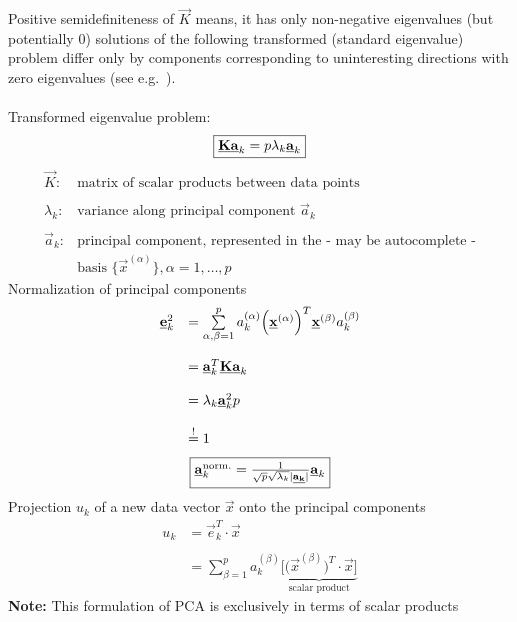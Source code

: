 Positive semidefiniteness of $\vec{K}$
means,
it has only non-negative eigenvalues (but potentially 0) 
\ra
solutions
of the following transformed (standard eigenvalue) problem differ only by components corresponding to
uninteresting directions with zero eigenvalues
(see e.g.\ \cite{Bishop2006}).
\\\\
Transformed eigenvalue problem:
\begin{equation}
	\fbox{$ \vec{K} \vec{a}_k = p \lambda_k \vec{a}_k $}
\end{equation}
\[ \begin{array}{ll}
	\vec{K}: & \text{matrix of scalar products between data points} \\\\
	\lambda_k: & \text{variance along principal component } \vec{a}_k \\\\
	\vec{a}_k: & \text{principal component, represented in the - may be 
		autocomplete -} \\
	&	\text{basis } \Big\{ \vec{x}^{(\alpha)} \Big\}, 
		\alpha = 1, \ldots, p
\end{array} \]
Normalization of principal components
\begin{equation}
	\begin{array}{ll}
		\vec{e}_k^2 
		& = \sum\limits_{\alpha, \beta = 1}^p a_k^{(\alpha)} 
			\Big( \vec{x}^{(\alpha)} \Big)^T \vec{x}^{(\beta)}
			a_k^{(\beta)} \\\\
		& = \vec{a}_k^T \vec{K} \vec{a}_k  \\\\
		& = \lambda_k \vec{a}_k^2 p\\\\
		& \eqexcl 1
	\end{array}
\end{equation}
\begin{equation}
	\fbox{$ \vec{a}_k^{\mathrm{norm.}} = 
			\frac{1}{\sqrt{p} \sqrt{\lambda_k} |\vec{a_k}|} 
			\vec{a}_k $}
\end{equation}
Projection $u_k$ of a new data vector $\vec{x}$ onto the principal components
\begin{equation}
	\begin{array}{ll}
	u_k
	& = \vec{e}_k^T \cdot \vec{x} \\\\
	& = \sum\limits_{\beta = 1}^p a_k^{(\beta)} 
		\underbrace{ \bigg[ \Big( \vec{x}^{(\beta)} \Big)^T 
				\cdot \vec{x} \bigg] }_{
					\text{scalar product} }
	\end{array}
\end{equation}
\textbf{Note:} This formulation of PCA is exclusively in terms of scalar products
\\\\


